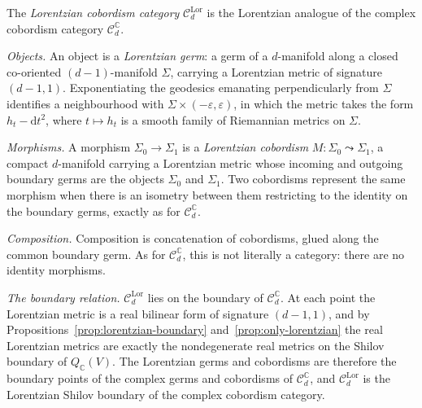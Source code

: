 \begin{definition}
  \label{def:lorentzian-cobordism-category}
  \leanok
  The \emph{Lorentzian cobordism category} $\mathcal C_d^{\mathrm{Lor}}$ is the
  Lorentzian analogue of the complex cobordism category
  $\mathcal C_d^{\mathbb C}$.

  \emph{Objects.} An object is a \emph{Lorentzian germ}: a germ of a $d$-manifold
  along a closed co-oriented $(d-1)$-manifold $\Sigma$, carrying a Lorentzian
  metric of signature $(d-1,1)$. Exponentiating the geodesics emanating
  perpendicularly from $\Sigma$ identifies a neighbourhood with
  $\Sigma \times (-\varepsilon, \varepsilon)$, in which the metric takes the form
  $h_t - \mathrm{d}t^2$, where $t \mapsto h_t$ is a smooth family of Riemannian
  metrics on $\Sigma$.

  \emph{Morphisms.} A morphism $\Sigma_0 \to \Sigma_1$ is a \emph{Lorentzian
  cobordism} $M \colon \Sigma_0 \leadsto \Sigma_1$, a compact $d$-manifold
  carrying a Lorentzian metric whose incoming and outgoing boundary germs are the
  objects $\Sigma_0$ and $\Sigma_1$. Two cobordisms represent the same morphism
  when there is an isometry between them restricting to the identity on the
  boundary germs, exactly as for $\mathcal C_d^{\mathbb C}$.

  \emph{Composition.} Composition is concatenation of cobordisms, glued along the
  common boundary germ. As for $\mathcal C_d^{\mathbb C}$, this is not literally a
  category: there are no identity morphisms.

  \emph{The boundary relation.} $\mathcal C_d^{\mathrm{Lor}}$ lies on the boundary
  of $\mathcal C_d^{\mathbb C}$. At each point the Lorentzian metric is a real
  bilinear form of signature $(d-1,1)$, and by
  Propositions~\ref{prop:lorentzian-boundary} and~\ref{prop:only-lorentzian} the
  real Lorentzian metrics are exactly the nondegenerate real metrics on the
  Shilov boundary of $Q_{\mathbb C}(V)$. The Lorentzian germs and cobordisms are
  therefore the boundary points of the complex germs and cobordisms of
  $\mathcal C_d^{\mathbb C}$, and $\mathcal C_d^{\mathrm{Lor}}$ is the Lorentzian
  Shilov boundary of the complex cobordism category.


\end{definition}
